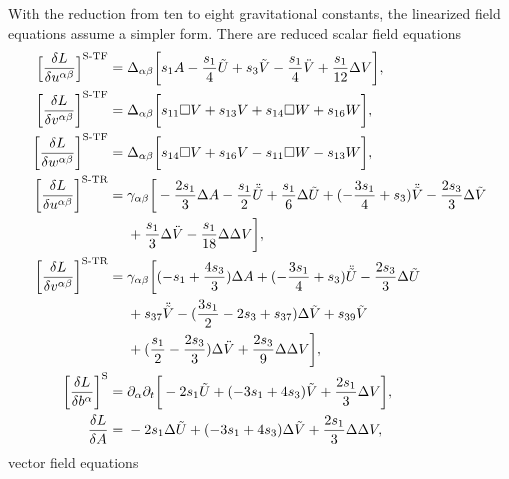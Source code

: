 With the reduction from ten to eight gravitational constants, the linearized field equations assume a simpler form. There are reduced scalar field equations
\begingroup\allowdisplaybreaks
\begin{align}\footnotesize
  \bigg\lbrack\frac{\delta L}{\delta u^{\alpha\beta}}\bigg\rbrack^\text{S-TF} = {} & \Delta_{\alpha\beta} \bigg\lbrack s_1 A -\frac{s_1}{4} \tilde U + s_3 \tilde V - \frac{s_1}{4} \ddot V + \frac{s_1}{12} \Delta V \bigg\rbrack, \nonumber \\
  \bigg\lbrack\frac{\delta L}{\delta v^{\alpha\beta}}\bigg\rbrack^\text{S-TF} = {} & \Delta_{\alpha\beta} \bigg\lbrack s_{11} \Box V + s_{13} V + s_{14} \Box W + s_{16} W \bigg\rbrack, \nonumber \\
  \bigg\lbrack\frac{\delta L}{\delta w^{\alpha\beta}}\bigg\rbrack^\text{S-TF} = {} & \Delta_{\alpha\beta} \bigg\lbrack s_{14} \Box V + s_{16} V - s_{11} \Box W - s_{13} W \bigg\rbrack, \nonumber \\
  \bigg\lbrack\frac{\delta L}{\delta u^{\alpha\beta}}\bigg\rbrack^\text{S-TR} = {} & \gamma_{\alpha\beta} \bigg\lbrack -\frac{2s_1}{3} \Delta A -\frac{s_1}{2} \ddot{\tilde U} + \frac{s_1}{6} \Delta\tilde U + (-\frac{3s_1}{4} + s_3) \ddot{\tilde V} -\frac{2s_3}{3} \Delta\tilde V \nonumber \\ & + \frac{s_1}{3} \Delta\ddot V - \frac{s_1}{18} \Delta\Delta V \bigg\rbrack, \label{scalar_equations_reduced} \\
  \bigg\lbrack\frac{\delta L}{\delta v^{\alpha\beta}}\bigg\rbrack^\text{S-TR} = {} & \gamma_{\alpha\beta} \bigg\lbrack (-s_1 + \frac{4s_3}{3}) \Delta A + (-\frac{3s_1}{4} + s_3) \ddot{\tilde U} - \frac{2s_3}{3} \Delta\tilde U \nonumber \\ & + s_{37} \ddot{\tilde V} - (\frac{3s_1}{2} - 2s_3 + s_{37}) \Delta\tilde V + s_{39} \tilde V \nonumber \\ & + (\frac{s_1}{2} - \frac{2s_3}{3}) \Delta\ddot V + \frac{2s_3}{9} \Delta\Delta V\bigg\rbrack, \nonumber \\
  \bigg\lbrack\frac{\delta L}{\delta b^{\alpha}}\bigg\rbrack^\text{S} = {} & \partial_\alpha \partial_t \bigg\lbrack -2s_1\tilde U + (-3s_1 + 4s_3) \tilde V + \frac{2s_1}{3} \Delta V\bigg\rbrack, \nonumber \\
  \frac{\delta L}{\delta A} = {} & -2s_1 \Delta\tilde U + (-3s_1 + 4s_3) \Delta\tilde V + \frac{2s_1}{3} \Delta\Delta V, \nonumber
\end{align}
\endgroup
vector field equations
\begingroup\allowdisplaybreaks
